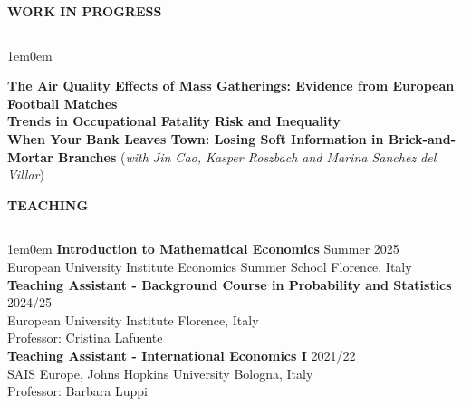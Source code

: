 \documentclass[12pt]{article}
\begin{document}
\vspace{0.5em} %
\noindent\textbf{WORK IN PROGRESS}\\
\noindent\rule[8pt]{\textwidth}{0.5pt}

\begin{adjustwidth}{1em}{0em}

\noindent \textbf{The Air Quality Effects of Mass Gatherings: Evidence from European Football Matches}\\

\noindent \textbf{Trends in Occupational Fatality Risk and Inequality}\\

\noindent\textbf{When Your Bank Leaves Town: Losing Soft Information in Brick-and-Mortar Branches} (\textit{with Jin Cao, Kasper Roszbach and Marina Sanchez del Villar})\\









\end{adjustwidth}



\vspace{0.5em} %
\noindent\textbf{TEACHING}\\
\noindent\rule[8pt]{\textwidth}{0.5pt}

\begin{adjustwidth}{1em}{0em}
\noindent\textbf{Introduction to Mathematical Economics} \hfill Summer 2025 \\
 European University Institute Economics Summer School \hfill Florence, Italy \\


\noindent\textbf{Teaching Assistant - Background Course in Probability and Statistics} \hfill 2024/25 \\
 European University Institute  \hfill Florence, Italy \\
 Professor: Cristina Lafuente\\


\noindent\textbf{Teaching Assistant - International Economics I} \hfill 2021/22 \\
 SAIS Europe, Johns Hopkins University  \hfill Bologna, Italy \\
 Professor: Barbara Luppi\\
\end{adjustwidth}
\end{document}
